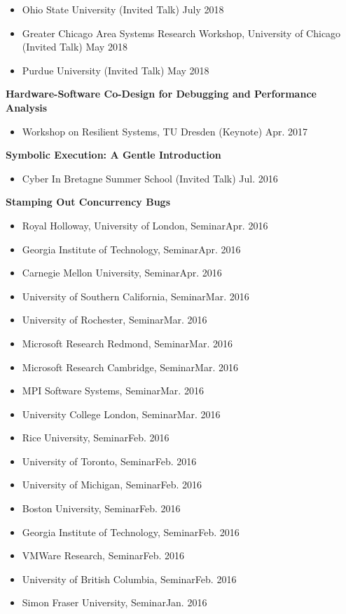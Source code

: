\documentclass[10pt]{article}
\newcommand{\mysub}[3]{\textbf{#1} {#2} \hfill {\em #3}}
\begin{document}
\vspace{-2mm}
\begin{itemize}
  \setlength\itemsep{0em}
\item{Ohio State University (Invited Talk)} \hfill July 2018
\item{Greater Chicago Area Systems Research Workshop, University of Chicago (Invited Talk)} \hfill May 2018
\item{Purdue University (Invited Talk)} \hfill May 2018
\end{itemize}
\mysub{Hardware-Software Co-Design for Debugging and Performance Analysis}{}{}
\vspace{-2mm}
\begin{itemize}
  \setlength\itemsep{0em}
  \item{Workshop on Resilient Systems, TU Dresden (Keynote)} \hfill Apr. 2017
\end{itemize}
\mysub{Symbolic Execution: A Gentle Introduction}{}{}
\vspace{-2mm}
\begin{itemize}
  \setlength\itemsep{0em}
  \item{Cyber In Bretagne Summer School (Invited Talk)} \hfill Jul. 2016
\end{itemize}

\mysub{Stamping Out Concurrency Bugs}{}{} 
\vspace{-2mm}
\begin{itemize}
\setlength\itemsep{0em}
\item{Royal Holloway, University of London, Seminar}\hfill Apr. 2016
\item{Georgia Institute of Technology, Seminar}\hfill Apr. 2016
\item{Carnegie Mellon University, Seminar}\hfill Apr. 2016
\item{University of Southern California, Seminar}\hfill Mar. 2016
\item{University of Rochester, Seminar}\hfill Mar. 2016
\item{Microsoft Research Redmond, Seminar}\hfill Mar. 2016
\item{Microsoft Research Cambridge, Seminar}\hfill Mar. 2016
\item{MPI Software Systems, Seminar}\hfill Mar. 2016
\item{University College London, Seminar}\hfill Mar. 2016
\item{Rice University, Seminar}\hfill Feb. 2016
\item{University of Toronto, Seminar}\hfill Feb. 2016
\item{University of Michigan, Seminar}\hfill Feb. 2016
\item{Boston University, Seminar}\hfill Feb. 2016
\item{Georgia Institute of Technology, Seminar}\hfill Feb. 2016
\item{VMWare Research, Seminar}\hfill Feb. 2016
\item{University of British Columbia, Seminar}\hfill Feb. 2016
\item{Simon Fraser University, Seminar}\hfill Jan. 2016
\end{itemize}
\end{document}
